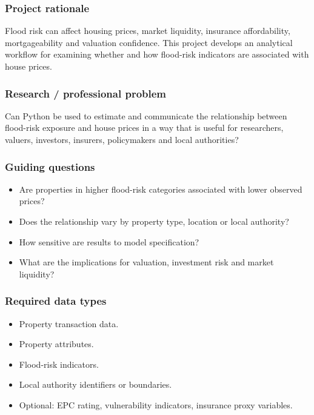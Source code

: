 \documentclass[
  a4paper,
]{article}
\providecommand{\tightlist}{%
  \setlength{\itemsep}{0pt}\setlength{\parskip}{0pt}}
\begin{document}
\subsubsection{Project rationale}\label{project-rationale}

Flood risk can affect housing prices, market liquidity, insurance
affordability, mortgageability and valuation confidence. This project
develops an analytical workflow for examining whether and how flood-risk
indicators are associated with house prices.

\subsubsection{Research / professional
problem}\label{research-professional-problem}

Can Python be used to estimate and communicate the relationship between
flood-risk exposure and house prices in a way that is useful for
researchers, valuers, investors, insurers, policymakers and local
authorities?

\subsubsection{Guiding questions}\label{guiding-questions}

\begin{itemize}
\tightlist
\item
  Are properties in higher flood-risk categories associated with lower
  observed prices?
\item
  Does the relationship vary by property type, location or local
  authority?
\item
  How sensitive are results to model specification?
\item
  What are the implications for valuation, investment risk and market
  liquidity?
\end{itemize}

\subsubsection{Required data types}\label{required-data-types}

\begin{itemize}
\tightlist
\item
  Property transaction data.
\item
  Property attributes.
\item
  Flood-risk indicators.
\item
  Local authority identifiers or boundaries.
\item
  Optional: EPC rating, vulnerability indicators, insurance proxy
  variables.
\end{itemize}
\end{document}
